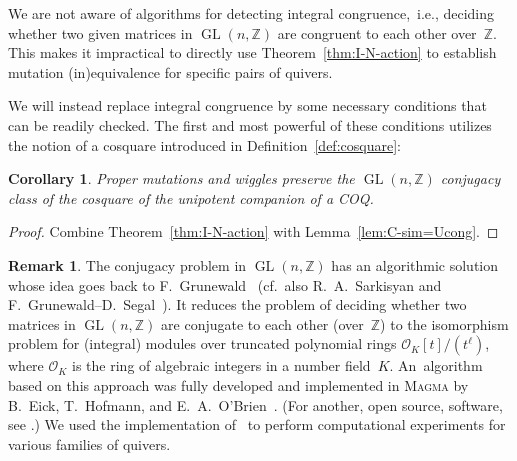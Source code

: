 \documentclass[11pt, letterpaper]{amsart}
\newtheorem{corollary}[theorem]{Corollary}
\theoremstyle{definition}
\newtheorem{remark}[theorem]{Remark}
\numberwithin{equation}{section}
\def\ZZ{{\mathbb Z}}
\def\GL{{\operatorname{GL}}}
\begin{document}
We are not aware of algorithms for detecting integral congruence,~i.e., deciding whether two given matrices in $\GL(n,\ZZ)$ are congruent to each other over~$\ZZ$. 
This makes it impractical to directly use Theorem~\ref{thm:I-N-action} 
to establish mutation (in)equivalence for specific pairs of quivers. 

We will instead replace integral congruence by some necessary conditions that can be readily checked.
The first and most powerful of these conditions utilizes the notion of a cosquare introduced in Definition~\ref{def:cosquare}: 

\begin{corollary}
\label{cor:proper-mutations-preserve-cosquare}
Proper mutations and wiggles preserve the $\GL(n,\ZZ)$ conjugacy class 
of the cosquare of the unipotent companion of a COQ.
\end{corollary}

\begin{proof}
Combine Theorem~\ref{thm:I-N-action} with Lemma~\ref{lem:C-sim=Ucong}. 
\end{proof}

\begin{remark}
\label{rem:algorithms-conjugacy}
The conjugacy problem in $\GL(n,\mathbb{Z})$ %
has an algorithmic solution whose idea goes back to F.~Grunewald~\cite{Grunewald}
(cf.~also R.~A.~Sarkisyan \cite{Sarkisjan} and F.~Grunewald--D.~Segal~\cite{Grunewald-Segal}).
It reduces the problem of deciding whether two matrices in $\GL(n,\ZZ)$ 
are conjugate to each other (over~$\ZZ$) 
to the isomorphism problem for (integral) modules over truncated polynomial rings $\mathcal{O}_K[t]/(t^\ell)$,
where $\mathcal{O}_K$ is the ring of algebraic integers in a number field~$K$. 
An~algorithm based on this approach was fully developed and implemented in \textsc{Magma}
by B.~Eick, T.~Hofmann, and E.~A.~O'Brien~\cite{EHO}. 
(For another, open source, software, see \cite[Section~9.5]{BHJ}.) 
We used the implementation of~\cite{EHO} to perform computational experiments
for various families of quivers. 
%
\end{remark}
\end{document}
